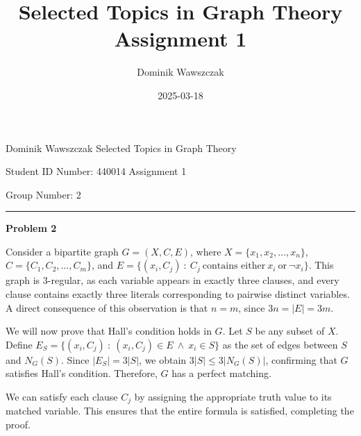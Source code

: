 \documentclass[12pt]{article}
\title{Selected Topics in Graph Theory Assignment 1}
\author{Dominik Wawszczak}
\date{2025-03-18}
\begin{document}
	\setlength{\parindent}{0 cm}
	
	Dominik Wawszczak \hfill Selected Topics in Graph Theory
	
	Student ID Number: 440014 \hfill Assignment 1
	
	Group Number: 2
	
	\bigskip
	\hrule
	\bigskip
	
	\textbf{Problem 2}
	
	\medskip
	
	Consider a bipartite graph \(G = (X, C, E)\), where \(X = \{x_{1}, x_{2},
	\ldots, x_{n}\}\), \(C = \{C_{1}, C_{2}, \ldots, C_{m}\}\), and \(E =
	\{(x_{i}, C_{j}) \ : \ C_{j} \ \text{contains either} \ x_{i} \ \text{or} \
	\neg x_{i}\}\). This graph is \(3\)-regular, as each variable appears in
	exactly three clauses, and every clause contains exactly three literals
	corresponding to pairwise distinct variables. A direct consequence of this
	observation is that \(n = m\), since \(3n = |E| = 3m\).
	
	\medskip
	
	We will now prove that Hall’s condition holds in \(G\). Let \(S\) be any
	subset of \(X\). Define \(E_{S} = \{(x_{i}, C_{j}) \ : \ (x_{i}, C_{j}) \in
	E \ \wedge \ x_{i} \in S\}\) as the set of edges between \(S\) and
	\(N_{G}(S)\). Since \(|E_{S}| = 3 |S|\), we obtain \(3 |S| \leqslant 3
	|N_{G}(S)|\), confirming that \(G\) satisfies Hall’s condition. Therefore,
	\(G\) has a perfect matching.
	
	\medskip
	
	We can satisfy each clause \(C_{j}\) by assigning the appropriate truth
	value to its matched variable. This ensures that the entire formula is
	satisfied, completing the proof.
\end{document}
